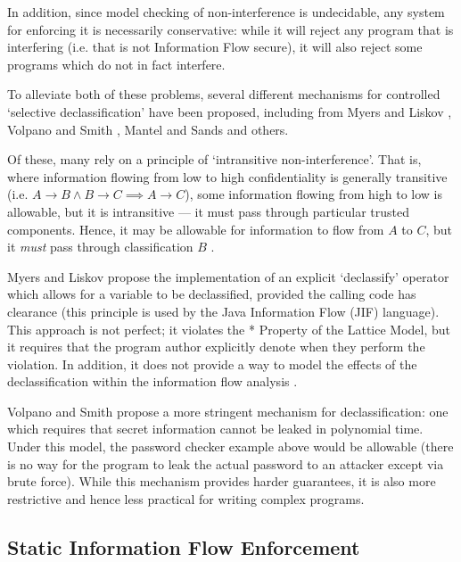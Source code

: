 In addition, since model checking of non-interference is undecidable, any system for enforcing it is necessarily conservative: while it will reject any program that is interfering (i.e. that is not Information Flow secure), it will also reject some programs which do not in fact interfere.

To alleviate both of these problems, several different mechanisms for controlled `selective declassification' have been proposed, including from Myers and Liskov \cite{myers1997if}, Volpano and Smith \cite{volpano2000declassification}, Mantel and Sands \cite{mantel2004controlled} and others.

Of these, many rely on a principle of `intransitive non-interference'. That is, where information flowing from low to high confidentiality is generally transitive (i.e. $ A \rightarrow B \wedge B \rightarrow C \implies A \rightarrow C $), some information flowing from high to low is allowable, but it is intransitive --- it must pass through particular trusted components. Hence, it may be allowable for information to flow from $ A $ to $ C $, but it \textit{must} pass through classification $ B $ \cite{roscoe1999intransitive}.

Myers and Liskov \cite{myers1997if} propose the implementation of an explicit `declassify' operator which allows for a variable to be declassified, provided the calling code has clearance (this principle is used by the Java Information Flow (JIF) language). This approach is not perfect; it violates the * Property of the Lattice Model, but it requires that the program author explicitly denote when they perform the violation. In addition, it does not provide a way to model the effects of the declassification within the information flow analysis  \cite{zdancewic2004challenges}.

Volpano and Smith \cite{volpano2000declassification} propose a more stringent mechanism for declassification: one which requires that secret information cannot be leaked in polynomial time. Under this model, the password checker example above would be allowable (there is no way for the program to leak the actual password to an attacker except via brute force). While this mechanism provides harder guarantees, it is also more restrictive \cite{zdancewic2004challenges} and hence less practical for writing complex programs.

\subsection{Static Information Flow Enforcement}

